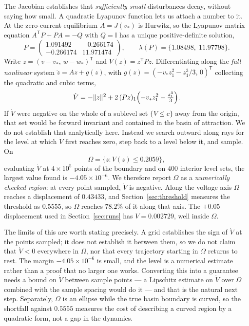 \documentclass[11pt,a4paper]{article}
\begin{document}
The Jacobian establishes that \emph{sufficiently small} disturbances decay, without saying how small. A quadratic Lyapunov function lets us attach a number to it. At the zero-current equilibrium $A=J(v_*)$ is Hurwitz, so the Lyapunov matrix equation $A^{\mathsf{T}}P+PA=-Q$ with $Q=\mathbb{I}$ has a unique positive-definite solution,
\begin{equation}
  P=\begin{pmatrix}1.091492 & -0.266174\\ -0.266174 & 11.971474\end{pmatrix},
  \qquad \lambda(P)=\{1.08498,\;11.97798\}.
  \label{eq:lyapP}
\end{equation}
Write $z=(v-v_*,\,w-w_*)^{\mathsf{T}}$ and $V(z)=z^{\mathsf{T}}Pz$. Differentiating along the \emph{full nonlinear} system $\dot z=Az+g(z)$, with $g(z)=(-v_*z_1^2-z_1^3/3,\,0)^{\mathsf{T}}$ collecting the quadratic and cubic terms,
\begin{equation}
  \dot V=-\lVert z\rVert^2+2\,(Pz)_1\Bigl(-v_*z_1^2-\tfrac{z_1^3}{3}\Bigr).
  \label{eq:Vdot}
\end{equation}
If $\dot V$ were negative on the whole of a sublevel set $\{V\le c\}$ away from the origin, that set would be forward invariant and contained in the basin of attraction. We do not establish that analytically here. Instead we search outward along rays for the level at which $\dot V$ first reaches zero, step back to a level below it, and sample. On
\begin{equation}
  \Omega=\{z:V(z)\le 0.2059\},
  \label{eq:lyapset}
\end{equation}
evaluating $\dot V$ at $4\times10^5$ points of the boundary and on $400$ interior level sets, the largest value found is $-4.05\times10^{-6}$. We therefore report $\Omega$ as a \emph{numerically checked region}: at every point sampled, $\dot V$ is negative. Along the voltage axis $\Omega$ reaches a displacement of $0.43433$, and Section~\ref{sec:threshold} measures the threshold as $0.5555$, so $\Omega$ reaches $78.2\%$ of it along that axis. The $+0.05$ displacement used in Section~\ref{sec:runs} has $V=0.002729$, well inside $\Omega$.

The limits of this are worth stating precisely. A grid establishes the sign of $\dot V$ at the points sampled; it does not establish it between them, so we do not claim that $\dot V<0$ everywhere in $\Omega$, nor that every trajectory starting in $\Omega$ returns to rest. The margin $-4.05\times10^{-6}$ is small, and the level is a numerical estimate rather than a proof that no larger one works. Converting this into a guarantee needs a bound on $\dot V$ between sample points --- a Lipschitz estimate on $\dot V$ over $\Omega$ combined with the sample spacing would do it --- and that is the natural next step. Separately, $\Omega$ is an ellipse while the true basin boundary is curved, so the shortfall against $0.5555$ measures the cost of describing a curved region by a quadratic form, not a gap in the dynamics.
\end{document}
